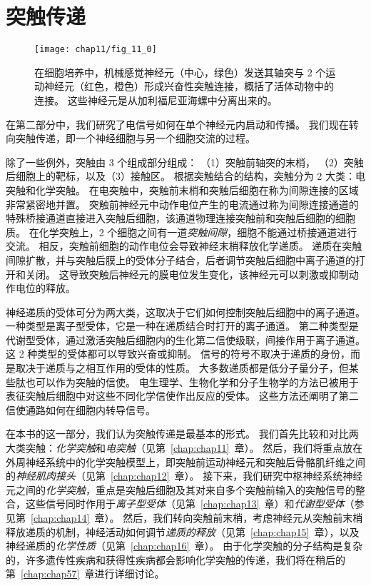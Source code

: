 \part{突触传递}


\begin{figure}[htbp]
	\centering
	\texttt{[image: chap11/fig\_11\_0]}
	\caption{在细胞培养中，机械感觉神经元（中心，绿色）发送其轴突与 2 个运动神经元（红色，橙色）形成兴奋性突触连接，概括了活体动物中的连接。
		这些神经元是从加利福尼亚海螺中分离出来的。}
	\label{fig:11_0}
\end{figure}


在第二部分中，我们研究了电信号如何在单个神经元内启动和传播。
我们现在转向突触传递，即一个神经细胞与另一个细胞交流的过程。


除了一些例外，突触由 3 个组成部分组成：
（1）突触前轴突的末梢，
（2）突触后细胞上的靶标，以及（3）接触区。
根据突触结合的结构，突触分为 2 大类：电突触和化学突触。
在电突触中，突触前末梢和突触后细胞在称为间隙连接的区域非常紧密地并置。
突触前神经元中动作电位产生的电流通过称为间隙连接通道的特殊桥接通道直接进入突触后细胞，该通道物理连接突触前和突触后细胞的细胞质。
在化学突触上，2 个细胞之间有一道\textit{突触间隙}，细胞不能通过桥接通道进行交流。
相反，突触前细胞的动作电位会导致神经末梢释放化学递质。
递质在突触间隙扩散，并与突触后膜上的受体分子结合，后者调节突触后细胞中离子通道的打开和关闭。
这导致突触后神经元的膜电位发生变化，该神经元可以刺激或抑制动作电位的释放。


神经递质的受体可分为两大类，这取决于它们如何控制突触后细胞中的离子通道。
一种类型是离子型受体，它是一种在递质结合时打开的离子通道。
第二种类型是代谢型受体，通过激活突触后细胞内的生化第二信使级联，间接作用于离子通道。
这 2 种类型的受体都可以导致兴奋或抑制。
信号的符号不取决于递质的身份，而是取决于递质与之相互作用的受体的性质。
大多数递质都是低分子量分子，但某些肽也可以作为突触的信使。
电生理学、生物化学和分子生物学的方法已被用于表征突触后细胞中对这些不同化学信使作出反应的受体。
这些方法还阐明了第二信使通路如何在细胞内转导信号。


在本书的这一部分，我们认为突触传递是最基本的形式。
我们首先比较和对比两大类突触：\textit{化学突触}和\textit{电突触}（见第~\ref{chap:chap11}~章）。
然后，我们将重点放在外周神经系统中的化学突触模型上，即突触前运动神经元和突触后骨骼肌纤维之间的\textit{神经肌肉接头}（见第~\ref{chap:chap12}~章）。
接下来，我们研究中枢神经系统神经元之间的\textit{化学突触}，重点是突触后细胞及其对来自多个突触前输入的突触信号的整合，这些信号同时作用于\textit{离子型受体}（见第~\ref{chap:chap13}~章）和\textit{代谢型受体}（参见第~\ref{chap:chap14}~章）。
然后，我们转向突触前末梢，考虑神经元从突触前末梢释放递质的机制，神经活动如何调节\textit{递质的释放}（见第~\ref{chap:chap15}~章），以及神经递质的\textit{化学性质}（见第~\ref{chap:chap16}~章）。
由于化学突触的分子结构是复杂的，许多遗传性疾病和获得性疾病都会影响化学突触的传递，我们将在稍后的第~\ref{chap:chap57}~章进行详细讨论。


